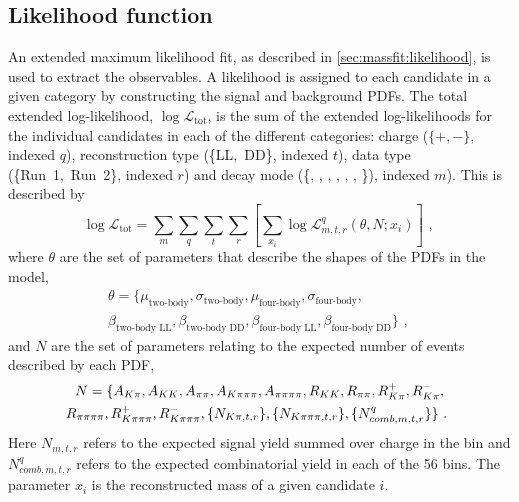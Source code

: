 \begin{table}[h]
\centering
{}
\caption{Summary of the veto efficiencies used in the \CP fit.}
\label{vetoeff}
\end{table}


\subsection{Likelihood function}
\label{sec:cpfit:likelihood}

An extended maximum likelihood fit, as described in \sect\ref{sec:massfit:likelihood}, is used to extract the \CP observables. A likelihood is assigned to each candidate in a given category by constructing the signal and background PDFs. The total extended log-likelihood, $\log\mathcal{L}_{\text{tot}}$, is the sum of the extended log-likelihoods for the individual candidates in each of the different categories: \B charge (\mbox{$\{+,-\}$}, indexed $q$), \KS reconstruction type (\mbox{\{LL, DD\}}, indexed $t$), data type (\mbox{\{Run 1, Run 2\}}, indexed $r$) and \Dz decay mode (\{\Km\pip, \Km\Kp, \pim\pip, \pim\Kp, \Km\pip\pim\pip, \pim\pip\pim\pip, \pim\Kp\pim\pip\}), indexed $m$). This is described by
\begin{equation}
\log\mathcal{L}_{\text{tot}} =  \sum_{m}\sum_{q}\sum_{t}\sum_{r}\left[\sum_{x_i} \log{\mathcal{L}}_{m,t,r}^q\left( \theta, N; x_i \right) \right] \text{ , }
\end{equation}
where $\theta$ are the set of parameters that describe the shapes of the PDFs in the model,
\begin{multline}
\theta = \{\mu_\text{two-body}, \sigma_\text{two-body}, \mu_\text{four-body}, \sigma_\text{four-body}, \\ \beta_\text{two-body LL}, \beta_\text{two-body DD}, \beta_\text{four-body LL}, \beta_\text{four-body DD}\} \text{ , }
\end{multline} 
and $N$ are the set of parameters relating to the expected number of events described by each PDF, 
\begin{multline}
N = \{A_{K\pi}, A_{KK}, A_{\pi\pi}, A_{K\pi\pi\pi}, A_{\pi\pi\pi\pi}, R_{KK}, R_{\pi\pi}, R^+_{K\pi}, R^-_{K\pi}, \\ R_{\pi\pi\pi\pi}, R^+_{K\pi\pi\pi}, R^-_{K\pi\pi\pi}, \{N_{K\pi,t,r}\}, \{N_{K\pi\pi\pi,t,r}\}, \{N_{comb,m,t,r}^{q}\}\} \text{ . }
\end{multline}
Here $N_{m,t,r}$ refers to the expected signal yield summed over charge in the bin and $N_{comb,m,t,r}^q$ refers to the expected combinatorial yield in each of the 56 bins. The parameter $x_i$ is  the reconstructed mass of a given candidate $i$.

